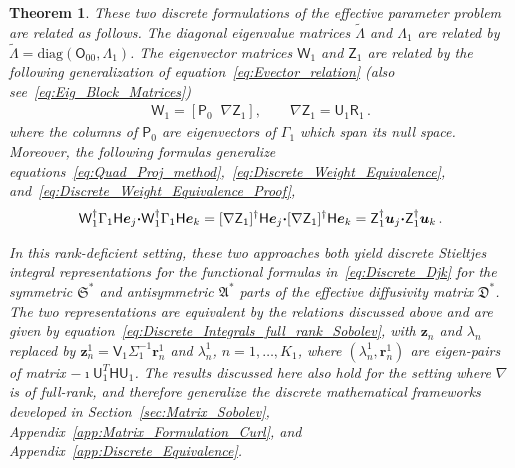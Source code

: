 \documentclass[english,12pt,jmp,graphicx]{revtex4-1}
\newcommand{\vecu}{\boldsymbol{u}}
\newcommand{\vecz}{\boldsymbol{z}}
\newcommand{\vece}{\boldsymbol{e}}
\newcommand{\secref}[1]{Section~\ref{#1}}
\newcommand{\appref}[1]{Appendix~\ref{#1}}
\newcommand{\bcdot}{\mbox{\boldmath${\cdot}$}}
\newcommand{\Sg}{\mathfrak{S}}
\newcommand{\Ag}{\mathfrak{A}}
\newcommand{\Dg}{\mathfrak{D}}
\newtheorem{theorem}{Theorem}
\newcommand{\Real}{\mbox{Re}\,}
\newcommand{\Imag}{\mbox{Im}\,}
\newcommand{\vecr}{\boldsymbol{r}}
\newcommand{\Hm}{\mathsf{H}}
\newcommand{\Um}{\mathsf{U}}
\newcommand{\Vm}{\mathsf{V}}
\newcommand{\Zm}{\mathsf{Z}}
\newcommand{\Wm}{\mathsf{W}}
\newcommand{\Pm}{\mathsf{P}}
\newcommand{\Rm}{\mathsf{R}}
\newcommand{\Om}{\mathsf{O}}
\begin{document}
\begin{theorem}
These two discrete formulations of the effective parameter problem are
related as follows. The diagonal eigenvalue matrices $\tilde{\Lambda}$
and $\Lambda_1$ are related by
$\tilde{\Lambda}=\text{diag}(\Om_{00},\Lambda_1)$. The eigenvector
matrices $\Wm_1$ and $\Zm_1$ are related by the following
generalization of equation~\eqref{eq:Evector_relation} (also
see~\eqref{eq:Eig_Block_Matrices}) 
%
\begin{align}\label{eq:Evector_relation_U1}
  \Wm_1=[\Pm_0\;\;\nabla\Zm_1], \qquad
  \nabla\Zm_1=\Um_1\Rm_1\,.
\end{align}
%
where the columns of $\Pm_0$ are eigenvectors of $\Gamma_1$ which span
its null space. Moreover, the following formulas generalize
equations~\eqref{eq:Quad_Proj_method},~\eqref{eq:Discrete_Weight_Equivalence},
and~\eqref{eq:Discrete_Weight_Equivalence_Proof},
% 
\begin{align}\label{eq:Measure_Weight_Equivalence_Gen}
 \Wm_1^\dagger\Gamma_1\Hm\vece_j\bcdot\Wm_1^\dagger\Gamma_1\Hm\vece_k
 =[\nabla\Zm_1]^\dagger\Hm\vece_j\bcdot[\nabla\Zm_1]^\dagger\Hm\vece_k
 =\Zm_1^\dagger\vecu_j\bcdot\Zm_1^\dagger\vecu_k\,.
\end{align}
%

In this rank-deficient setting, these two approaches both yield discrete
Stieltjes integral representations for the functional formulas
in~\eqref{eq:Discrete_Djk} for the symmetric $\Sg^*$ and 
antisymmetric $\Ag^*$ parts of the effective diffusivity matrix
$\Dg^*$. The two representations are equivalent by the relations
discussed above and are given by
equation~\eqref{eq:Discrete_Integrals_full_rank_Sobolev},
with $\vecz_n$ and $\lambda_n$ replaced by
$\vecz_n^1=\Vm_1\Sigma_1^{-1}\vecr_n^1$ and $\lambda^1_n$,
$n=1,\ldots,K_1$, where $(\lambda^1_n,\vecr_n^1)$ are eigen-pairs of
matrix $-\imath\Um_1^T\Hm\Um_1$. The results 
discussed here also 
hold for the setting where $\nabla$ is of full-rank, and therefore
generalize the discrete mathematical frameworks developed in
\secref{sec:Matrix_Sobolev}, \appref{app:Matrix_Formulation_Curl}, and
\appref{app:Discrete_Equivalence}.   
%
\end{theorem}
\end{document}
